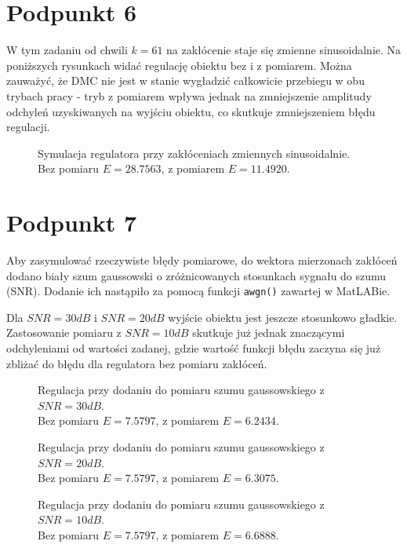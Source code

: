 \chapter{Podpunkt 6}
W tym zadaniu od chwili $ k = \num{61} $ na zakłócenie staje się zmienne sinusoidalnie. Na poniższych rysunkach widać regulację obiektu bez i z pomiarem. Można zauważyć, że DMC nie jest w stanie wygładzić całkowicie przebiegu w obu trybach pracy - tryb z pomiarem wpływa jednak na zmniejszenie amplitudy odchyleń uzyskiwanych na wyjściu obiektu, co skutkuje zmniejszeniem błędu regulacji. 

\begin{figure}[ht]
\centering

\caption{Symulacja regulatora przy zakłóceniach zmiennych sinusoidalnie.\\Bez pomiaru $ E = \num{28,7563} $, z pomiarem $ E = \num{11,4920} $.}
\label{Z6a}
\end{figure}

\chapter{Podpunkt 7}
Aby zasymulować rzeczywiste błędy pomiarowe, do wektora mierzonach zakłóceń dodano biały szum gaussowski o zróżnicowanych stosunkach sygnału do szumu (SNR). Dodanie ich nastąpiło za pomocą funkcji \verb|awgn()| zawartej w MatLABie.

Dla $ \mathit{SNR} = 30\mathit{dB} $ i $ \mathit{SNR} = 20\mathit{dB} $ wyjście obiektu jest jeszcze stosunkowo gładkie. Zastosowanie pomiaru z $ \mathit{SNR} = 10\mathit{dB} $ skutkuje już jednak znaczącymi odchyleniami od wartości zadanej, gdzie wartość funkcji błędu zaczyna się już zbliżać do błędu dla regulatora bez pomiaru zakłóceń.

\begin{figure}[ht]
	\centering
	
	\caption{Regulacja przy dodaniu do pomiaru szumu gaussowskiego z $ \mathit{SNR} = 30\mathit{dB} $.\\Bez pomiaru $ E = \num{7,5797} $, z pomiarem $ E = \num{6,2434}  $.}
	\label{Z7a}
\end{figure}
\begin{figure}[ht]
	\centering
	
	\caption{Regulacja przy dodaniu do pomiaru szumu gaussowskiego z $ \mathit{SNR} = 20\mathit{dB} $.\\Bez pomiaru $ E = \num{7,5797} $, z pomiarem $ E = \num{6,3075} $.}
	\label{Z7b}
\end{figure}
\begin{figure}[ht]
	\centering
	
	\caption{Regulacja przy dodaniu do pomiaru szumu gaussowskiego z $ \mathit{SNR} = 10\mathit{dB} $.\\Bez pomiaru $ E = \num{7,5797} $, z pomiarem $ E = \num{6,6888} $. }
	\label{Z7c}
\end{figure}
